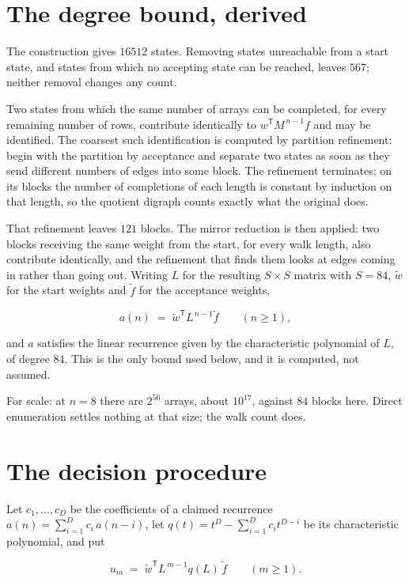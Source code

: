 \documentclass[11pt]{article}
\theoremstyle{definition}
\begin{document}
\section{The degree bound, derived}

The construction gives $16512$ states. Removing states unreachable from a start state, and states from which no accepting state can be reached, leaves $567$; neither removal changes any count.

Two states from which the same number of arrays can be completed, for every remaining number of rows, contribute identically to $w^{\mathsf T}M^{\,n-1}f$ and may be identified. The coarsest such identification is computed by partition refinement: begin with the partition by acceptance and separate two states as soon as they send different numbers of edges into some block. The refinement terminates; on its blocks the number of completions of each length is constant by induction on that length, so the quotient digraph counts exactly what the original does.

That refinement leaves $121$ blocks. The mirror reduction is then applied: two blocks receiving the same weight from the start, for every walk length, also contribute identically, and the refinement that finds them looks at edges coming in rather than going out. Writing $L$ for the resulting $S \times S$ matrix with $S = 84$, $\tilde w$ for the start weights and $\tilde f$ for the acceptance weights,

\[a(n) \;=\; \tilde w^{\mathsf T} L^{\,n-1} \tilde f \qquad (n \ge 1),\]

and $a$ satisfies the linear recurrence given by the characteristic polynomial of $L$, of degree $84$. This is the only bound used below, and it is computed, not assumed.

For scale: at $n = 8$ there are $2^{56}$ arrays, about $10^{17}$, against $84$ blocks here. Direct enumeration settles nothing at that size; the walk count does.

\section{The decision procedure}

Let $c_1,\dots,c_D$ be the coefficients of a claimed recurrence $a(n) = \sum_{i=1}^{D} c_i\,a(n-i)$, let $q(t) = t^{D} - \sum_{i=1}^{D} c_i t^{D-i}$ be its characteristic polynomial, and put

\[u_m \;=\; \tilde w^{\mathsf T} L^{\,m-1} q(L)\,\tilde f \qquad (m \ge 1).\]
\end{document}
